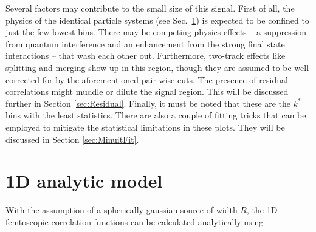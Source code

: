 Several factors may contribute to the small size of this signal.  First of all, the physics of the identical particle systems (see Sec.\ \ref{sec:AnalyticModel}) is expected to be confined to just the few lowest bins.  There may be competing physics effects -- a suppression from quantum interference and an enhancement from the strong final state interactions -- that wash each other out.  Furthermore, two-track effects like splitting and merging show up in this region, though they are assumed to be well-corrected for by the aforementioned pair-wise cuts.  The presence of residual correlations might muddle or dilute the signal region.  This will be discussed further in Section \ref{sec:Residual}.  Finally, it must be noted that these are the $k^*$ bins with the least statistics.  There are also a couple of fitting tricks that can be employed to mitigate the statistical limitations in these plots.  They will be discussed in Section \ref{sec:MinuitFit}.






\section{1D analytic model}
\label{sec:AnalyticModel}
With the assumption of a spherically gaussian source of width $R$, the 1D femtoscopic correlation functions can be calculated analytically \cite{lednicky82} using 

